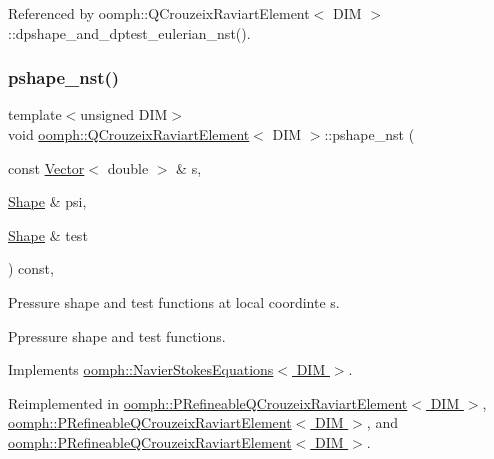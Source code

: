 Referenced by oomph\+::\+Q\+Crouzeix\+Raviart\+Element$<$ D\+I\+M $>$\+::dpshape\+\_\+and\+\_\+dptest\+\_\+eulerian\+\_\+nst().

\mbox{\label{classoomph_1_1QCrouzeixRaviartElement_a662b9593c9ca0b4589d5498812f1fb91}} 
\subsubsection{\texorpdfstring{pshape\+\_\+nst()}{pshape\_nst()}\hspace{0.1cm}{\footnotesize\ttfamily [2/4]}}
{\footnotesize\ttfamily template$<$unsigned D\+IM$>$ \\
void \hyperlink{classoomph_1_1QCrouzeixRaviartElement}{oomph\+::\+Q\+Crouzeix\+Raviart\+Element}$<$ D\+IM $>$\+::pshape\+\_\+nst (\begin{DoxyParamCaption}\item[{const \hyperlink{classoomph_1_1Vector}{Vector}$<$ double $>$ \&}]{s,  }\item[{\hyperlink{classoomph_1_1Shape}{Shape} \&}]{psi,  }\item[{\hyperlink{classoomph_1_1Shape}{Shape} \&}]{test }\end{DoxyParamCaption}) const\hspace{0.3cm}{\ttfamily [inline]}, {\ttfamily [virtual]}}



Pressure shape and test functions at local coordinte s. 

Ppressure shape and test functions. 

Implements \hyperlink{classoomph_1_1NavierStokesEquations_a55f96a5c9f985476aeb145f683d63001}{oomph\+::\+Navier\+Stokes\+Equations$<$ D\+I\+M $>$}.



Reimplemented in \hyperlink{classoomph_1_1PRefineableQCrouzeixRaviartElement_acf1d5e8b3dc66e12bff22d73d06ea4d6}{oomph\+::\+P\+Refineable\+Q\+Crouzeix\+Raviart\+Element$<$ D\+I\+M $>$}, \hyperlink{classoomph_1_1PRefineableQCrouzeixRaviartElement_aa3cf8c270ec40c6d7c507b71dd6676d3}{oomph\+::\+P\+Refineable\+Q\+Crouzeix\+Raviart\+Element$<$ D\+I\+M $>$}, and \hyperlink{classoomph_1_1PRefineableQCrouzeixRaviartElement_a5891e3675a411f77fca204fa567c71da}{oomph\+::\+P\+Refineable\+Q\+Crouzeix\+Raviart\+Element$<$ D\+I\+M $>$}.




